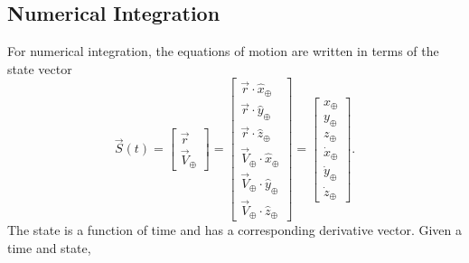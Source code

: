 \subsection{Numerical Integration}\label{sec:numerical-integration}

For numerical integration, the equations of motion are written in terms of the state
vector
\begin{equation}
  \vec S(t)
  =\begin{bmatrix}\vec r\\[0.2em]\vec V_{\oplus}\end{bmatrix}
  =\begin{bmatrix}
    \vec r\mathbin{\cdot}\hat x_{\oplus}\\
    \vec r\mathbin{\cdot}\hat y_{\oplus}\\
    \vec r\mathbin{\cdot}\hat z_{\oplus}\\
    \vec V_{\oplus}\mathbin{\cdot}\hat x_{\oplus}\\
    \vec V_{\oplus}\mathbin{\cdot}\hat y_{\oplus}\\
    \vec V_{\oplus}\mathbin{\cdot}\hat z_{\oplus}
  \end{bmatrix}
  =\begin{bmatrix}
    x_{\oplus}\\y_{\oplus}\\z_{\oplus}\\
    \dot x_{\oplus}\\\dot y_{\oplus}\\\dot z_{\oplus}
  \end{bmatrix}.
  \label{eq:trajectory-state-vector}
\end{equation}
The state is a function of time and has a corresponding derivative vector. Given a
time and state,
